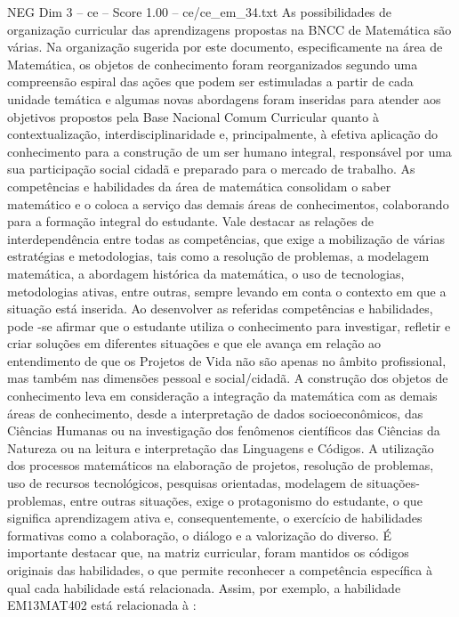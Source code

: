 \begin{textsample}{NEG Dim 3 – ce – Score 1.00 – ce/ce\_em\_34.txt}
As possibilidades de organização curricular das aprendizagens propostas na BNCC de Matemática são várias.
Na organização sugerida por este documento, especificamente na área de Matemática, os objetos de conhecimento foram reorganizados segundo uma compreensão espiral das ações que podem ser estimuladas a partir de cada unidade temática e algumas novas abordagens foram inseridas para atender aos objetivos propostos pela Base Nacional Comum Curricular quanto à contextualização, interdisciplinaridade e, principalmente, à efetiva aplicação do conhecimento para a construção de um ser humano integral, responsável por uma sua participação social cidadã e preparado para o mercado de trabalho.
As competências e habilidades da área de matemática consolidam o saber matemático e o coloca a serviço das demais áreas de conhecimentos, colaborando para a formação integral do estudante.
Vale destacar as relações de interdependência entre todas as competências, que exige a mobilização de várias estratégias e metodologias, tais como a resolução de problemas, a modelagem matemática, a abordagem histórica da matemática, o uso de tecnologias, metodologias ativas, entre outras, sempre levando em conta o contexto em que a situação está inserida.
Ao desenvolver as referidas competências e habilidades, pode -se afirmar que o estudante utiliza o conhecimento para investigar, refletir e criar soluções em diferentes situações e que ele avança em relação ao entendimento de que os Projetos de Vida não são apenas no âmbito profissional, mas também nas dimensões pessoal e social/cidadã.
A construção dos objetos de conhecimento leva em consideração a integração da matemática com as demais áreas de conhecimento, desde a interpretação de dados socioeconômicos, das Ciências Humanas ou na investigação dos fenômenos científicos das Ciências da Natureza ou na leitura e interpretação das Linguagens e Códigos.
A utilização dos processos matemáticos na elaboração de projetos, resolução de problemas, uso de recursos tecnológicos, pesquisas orientadas, modelagem de situações-problemas, entre outras situações, exige o protagonismo do estudante, o que significa aprendizagem ativa e, consequentemente, o exercício de habilidades formativas como a colaboração, o diálogo e a valorização do diverso.
É importante destacar que, na matriz curricular, foram mantidos os códigos originais das habilidades, o que permite reconhecer a competência específica à qual cada habilidade está relacionada.
Assim, por exemplo, a habilidade EM13MAT402 está relacionada à :

\end{textsample}
